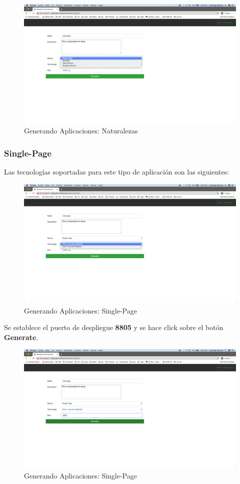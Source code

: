 \documentclass[a4paper,11pt]{book}
\begin{document}
\begin{figure}[H]
\centering
\includegraphics[scale=0.2]{imagenes/casouso/6.png}
\caption{  Generando Aplicaciones: Naturalezas  }
\end{figure}
\subsubsection{Single-Page}

Las tecnologías soportadas para este tipo de aplicación son las siguientes: 

\begin{figure}[H]
\centering
\includegraphics[scale=0.2]{imagenes/casouso/7.png}
\caption{ Generando Aplicaciones: Single-Page   }
\end{figure}

Se establece el puerto de despliegue \textbf{8805} y se hace click sobre el botón \textbf{Generate}.
\begin{figure}[H]
\centering
\includegraphics[scale=0.2]{imagenes/casouso/8.png}
\caption{  Generando Aplicaciones: Single-Page  }
\end{figure}
\end{document}
